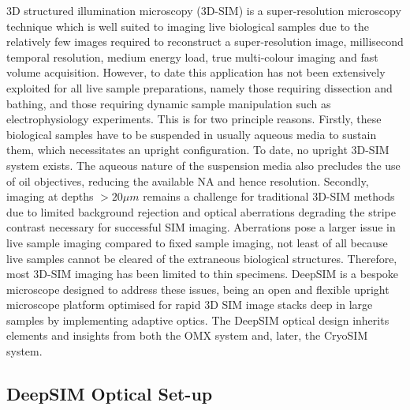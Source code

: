 3D structured illumination microscopy (3D-SIM) is a super-resolution 
microscopy technique which is well suited to imaging live biological samples 
due to the relatively few images required to reconstruct a super-resolution 
image, millisecond temporal resolution, medium energy load, true multi-colour 
imaging and fast volume 
acquisition\cite{schermelleh2010guide,schermelleh2019super,schermelleh2008subdiffraction}.
However, to date this application has not been extensively exploited for all 
live sample preparations, namely those requiring dissection and bathing, and 
those requiring dynamic sample manipulation such as electrophysiology 
experiments. This is for two principle reasons. Firstly, these biological 
samples have to be suspended in usually aqueous  media to sustain them, which 
necessitates an upright configuration. To date, no upright 3D-SIM system 
exists. The aqueous nature of the suspension media also precludes the use of 
oil objectives, reducing the available NA and hence resolution. Secondly, 
imaging at depths $>20\mu m$ remains a challenge for traditional 3D-SIM 
methods due to limited background rejection and optical aberrations degrading 
the stripe contrast necessary for successful SIM imaging\cite{wu2018faster}. 
Aberrations pose a larger issue in live sample imaging compared to fixed 
sample imaging, not least of all because live samples cannot be cleared of 
the extraneous biological structures. Therefore, most 3D-SIM imaging has been 
limited to thin specimens\cite{weil2010distinguishing}. DeepSIM is a bespoke 
microscope designed to address these issues, being an open and flexible 
upright microscope platform optimised for rapid 3D SIM image stacks deep in 
large samples by implementing adaptive optics. The DeepSIM optical design 
inherits elements and insights from both the OMX 
system\cite{haase2008omx,dobbie2011omx} and, later, the CryoSIM 
system\cite{phillips2020cryosim}.

\subsection{DeepSIM Optical Set-up}
\label{subsec:DeepSIM_optics}

